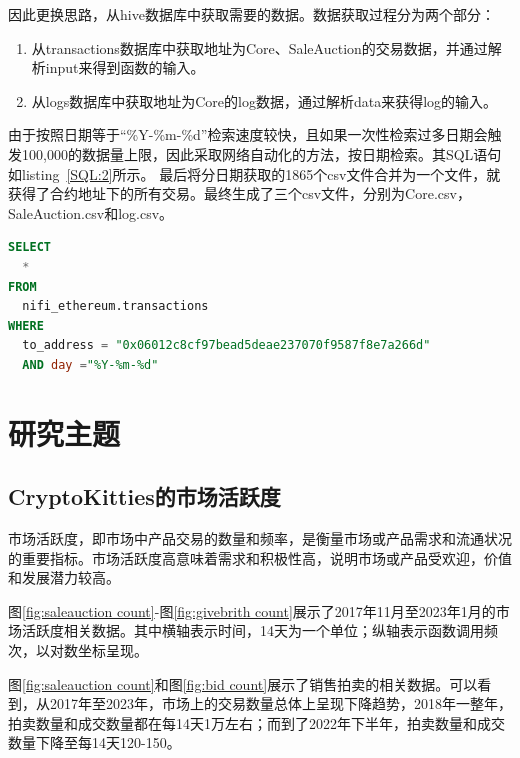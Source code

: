 \documentclass{myreport}
\begin{document}
因此更换思路，从hive数据库中获取需要的数据。数据获取过程分为两个部分：
\begin{enumerate}
\item 从transactions数据库中获取地址为Core、SaleAuction的交易数据，并通过解析input来得到函数的输入。

\item 从logs数据库中获取地址为Core的log数据，通过解析data来获得log的输入。
\end{enumerate}


由于按照日期等于“\%Y-\%m-\%d”检索速度较快，且如果一次性检索过多日期会触发100,000的数据量上限，因此采取网络自动化的方法，按日期检索。其SQL语句如listing~\ref{SQL:2}所示。%
最后将分日期获取的1865个csv文件合并为一个文件，就获得了合约地址下的所有交易。最终生成了三个csv文件，分别为Core.csv，SaleAuction.csv和log.csv。


\begin{lstlisting}[language=Sql,caption=获取智能合约地址下的所有数据,label=SQL:2]
SELECT
  * 
FROM 
  nifi_ethereum.transactions 
WHERE 
  to_address = "0x06012c8cf97bead5deae237070f9587f8e7a266d"
  AND day ="%Y-%m-%d"
 \end{lstlisting}

\section{研究主题}

\subsection{CryptoKitties的市场活跃度}
市场活跃度，即市场中产品交易的数量和频率，是衡量市场或产品需求和流通状况的重要指标。市场活跃度高意味着需求和积极性高，说明市场或产品受欢迎，价值和发展潜力较高。

图\ref{fig:saleauction count}-图\ref{fig:givebrith count}展示了2017年11月至2023年1月的市场活跃度相关数据。其中横轴表示时间，14天为一个单位；纵轴表示函数调用频次，以对数坐标呈现。

图\ref{fig:saleauction count}和图\ref{fig:bid count}展示了销售拍卖的相关数据。可以看到，从2017年至2023年，市场上的交易数量总体上呈现下降趋势，2018年一整年，拍卖数量和成交数量都在每14天1万左右；而到了2022年下半年，拍卖数量和成交数量下降至每14天120-150。
\end{document}
